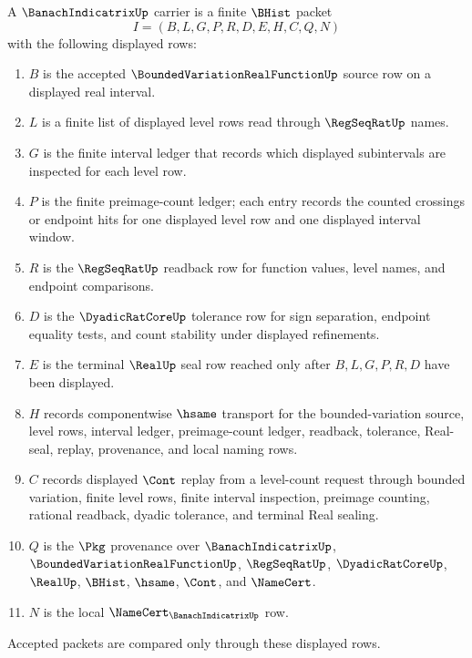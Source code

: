 \begin{definition}
\label{def:banach-indicatrix-carrier}
A $\BanachIndicatrixUp$ carrier is a finite $\BHist$ packet
$$
I=(B,L,G,P,R,D,E,H,C,Q,N)
$$
with the following displayed rows:
\begin{enumerate}
\item $B$ is the accepted $\BoundedVariationRealFunctionUp$ source row on a displayed real interval.
\item $L$ is a finite list of displayed level rows read through $\RegSeqRatUp$ names.
\item $G$ is the finite interval ledger that records which displayed subintervals are inspected for each level row.
\item $P$ is the finite preimage-count ledger; each entry records the counted crossings or endpoint hits for one displayed level row and one displayed interval window.
\item $R$ is the $\RegSeqRatUp$ readback row for function values, level names, and endpoint comparisons.
\item $D$ is the $\DyadicRatCoreUp$ tolerance row for sign separation, endpoint equality tests, and count stability under displayed refinements.
\item $E$ is the terminal $\RealUp$ seal row reached only after $B,L,G,P,R,D$ have been displayed.
\item $H$ records componentwise $\hsame$ transport for the bounded-variation source, level rows, interval ledger, preimage-count ledger, readback, tolerance, Real-seal, replay, provenance, and local naming rows.
\item $C$ records displayed $\Cont$ replay from a level-count request through bounded variation, finite level rows, finite interval inspection, preimage counting, rational readback, dyadic tolerance, and terminal Real sealing.
\item $Q$ is the $\Pkg$ provenance over $\BanachIndicatrixUp$, $\BoundedVariationRealFunctionUp$, $\RegSeqRatUp$, $\DyadicRatCoreUp$, $\RealUp$, $\BHist$, $\hsame$, $\Cont$, and $\NameCert$.
\item $N$ is the local $\NameCert_{\BanachIndicatrixUp}$ row.
\end{enumerate}
Accepted packets are compared only through these displayed rows.
\end{definition}

